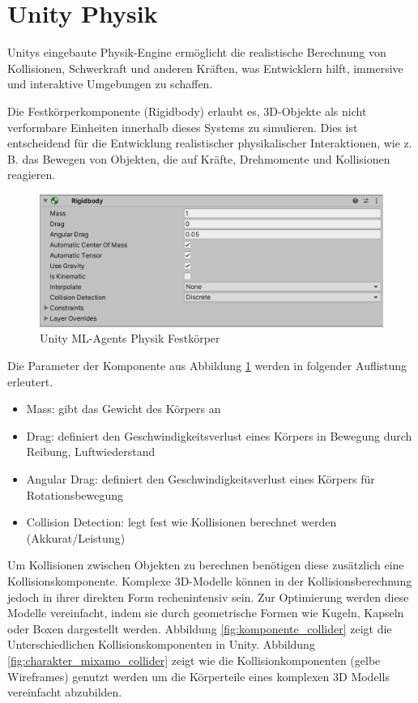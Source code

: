 \section{Unity Physik}
\label{sec:physik}
Unitys eingebaute Physik-Engine ermöglicht die realistische Berechnung von Kollisionen, Schwerkraft und anderen Kräften, was Entwicklern hilft, immersive und interaktive Umgebungen zu schaffen.

Die Festkörperkomponente (Rigidbody) erlaubt es, 3D-Objekte als nicht verformbare Einheiten innerhalb dieses Systems zu simulieren. Dies ist entscheidend für die Entwicklung realistischer physikalischer Interaktionen, wie z. B. das Bewegen von Objekten, die auf Kräfte, Drehmomente und Kollisionen reagieren.

\begin{figure}[H]
  \centering  
  \includegraphics[scale=0.5]{img/komponente_rigidbody}
  \caption{Unity ML-Agents Physik Festkörper}
  \label{fig:komponente_rigidbody}
\end{figure}

Die Parameter der Komponente aus Abbildung \ref{fig:komponente_rigidbody} werden in folgender Auflistung erleutert.

\begin{itemize}
  \item Mass: gibt das Gewicht des Körpers an
  \item Drag: definiert den Geschwindigkeitsverlust eines Körpers in Bewegung durch Reibung, Luftwiederstand
  \item Angular Drag: definiert den Geschwindigkeitsverlust eines Körpers für Rotationsbewegung
  \item Collision Detection: legt fest wie Kollisionen berechnet werden (Akkurat/Leistung)
 \end{itemize}
 
Um Kollisionen zwischen Objekten zu berechnen benötigen diese zusätzlich eine Kollisionskomponente. Komplexe 3D-Modelle können in der Kollisionsberechnung jedoch in ihrer direkten Form rechenintensiv sein. Zur Optimierung werden diese Modelle vereinfacht, indem sie durch geometrische Formen wie Kugeln, Kapseln oder Boxen dargestellt werden. Abbildung \ref{fig:komponente_collider} zeigt die Unterschiedlichen Kollisionskomponenten in Unity. Abbildung \ref{fig:charakter_mixamo_collider} zeigt wie die Kollisionkomponenten (gelbe Wireframes) genutzt werden um die Körperteile eines komplexen 3D Modells vereinfacht abzubilden.

